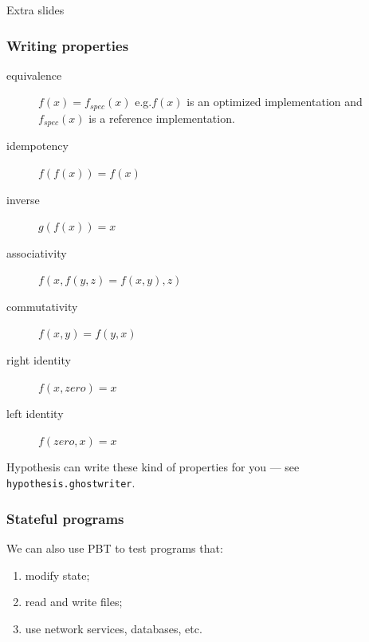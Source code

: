 \documentclass{beamer}
\begin{document}
\begin{frame}
\begin{center}
  \Huge Extra slides
\end{center} 
\end{frame}


\begin{frame}
  \frametitle{Writing properties}

  \begin{description}
  \item[equivalence] $f(x) = f_{spec} (x)$
  e.g.\@ $f(x)$ is an optimized implementation
  and $f_{spec}(x)$ is a reference implementation.
    
  \item[idempotency] $f(f(x)) = f(x)$
  \item[inverse]  $g(f(x)) = x$ 
  \item[associativity] $f(x,f(y,z) = f(x,y),z)$
  \item[commutativity] $f(x,y) = f(y,x)$
  \item[right identity] $f(x,zero) = x$
  \item[left identity] $f(zero,x)= x$
  \end{description}
  \bigskip

  Hypothesis can write these kind of properties for you ---
  see \texttt{hypothesis.ghostwriter}.

\end{frame}


\begin{frame}
  \frametitle{Stateful programs}

We can also use PBT to test programs that:
\begin{enumerate}
\item modify state;
\item read and write files;
\item use network services, databases, etc.
\end{enumerate}
\end{frame}
\end{document}
